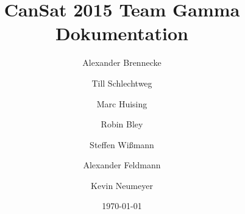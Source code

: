 \documentclass{article}
\begin{document}
\title{CanSat 2015 Team Gamma Dokumentation}
\date{\today}
\author{Alexander Brennecke \and Till Schlechtweg \and Marc Huising \and Robin Bley \and Steffen Wißmann \and Alexander Feldmann \and Kevin Neumeyer}
\maketitle

\newpage

\tableofcontents
\newpage












\end{document}

